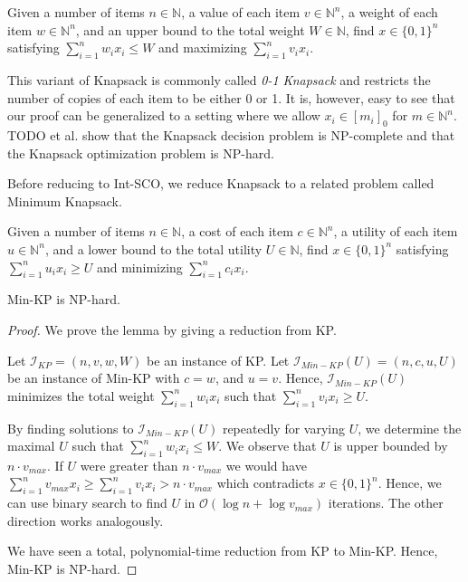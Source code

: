 \begin{problem}[Knapsack (KP)]
Given a number of items $n \in \mathbb{N}$, a value of each item $v \in \mathbb{N}^n$, a weight of each item $w \in \mathbb{N}^n$, and an upper bound to the total weight $W \in \mathbb{N}$, find $x \in \{0,1\}^n$ satisfying $\sum_{i = 1}^n w_i x_i \leq W$ and maximizing $\sum_{i=1}^n v_i x_i$.
\end{problem}

This variant of Knapsack is commonly called \textit{0-1 Knapsack} and restricts the number of copies of each item to be either 0 or 1. It is, however, easy to see that our proof can be generalized to a setting where we allow $x_i \in [m_i]_0$ for $m \in \mathbb{N}^n$. TODO et al. show that the Knapsack decision problem is NP-complete and that the Knapsack optimization problem is NP-hard.

Before reducing to Int-SCO, we reduce Knapsack to a related problem called Minimum Knapsack.

\begin{problem}
Given a number of items $n \in \mathbb{N}$, a cost of each item $c \in \mathbb{N}^n$, a utility of each item $u \in \mathbb{N}^n$, and a lower bound to the total utility $U \in \mathbb{N}$, find $x \in \{0,1\}^n$ satisfying $\sum_{i = 1}^n u_i x_i \geq U$ and minimizing $\sum_{i=1}^n c_i x_i$.
\end{problem}

\begin{lemma}
Min-KP is NP-hard.
\end{lemma}
\begin{proof}
We prove the lemma by giving a reduction from KP.

Let $\mathcal{I}_{KP} = (n, v, w, W)$ be an instance of KP. Let $\mathcal{I}_{Min-KP}(U) = (n, c, u, U)$ be an instance of Min-KP with $c = w$, and $u = v$. Hence, $\mathcal{I}_{Min-KP}(U)$ minimizes the total weight $\sum_{i=1}^n w_i x_i$ such that $\sum_{i=1}^n v_i x_i \geq U$.

By finding solutions to $\mathcal{I}_{Min-KP}(U)$ repeatedly for varying $U$, we determine the maximal $U$ such that $\sum_{i=1}^n w_i x_i \leq W$. We observe that $U$ is upper bounded by $n \cdot v_{max}$. If $U$ were greater than $n \cdot v_{max}$ we would have $\sum_{i=1}^n v_{max} x_i \geq \sum_{i=1}^n v_i x_i > n \cdot v_{max}$ which contradicts $x \in \{0,1\}^n$. Hence, we can use binary search to find $U$ in $\mathcal{O}(\log n + \log v_{max})$ iterations. The other direction works analogously.

We have seen a total, polynomial-time reduction from KP to Min-KP. Hence, Min-KP is NP-hard.
\end{proof}

